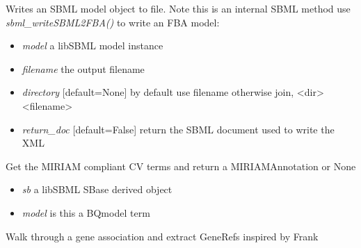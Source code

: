 \documentclass[a4paper,11pt,english]{sphinxmanual}
\begin{document}
\begin{fulllineitems}
\label{modules_doc:cbmpy.CBXML.sbml_exportSBML2FBAModel}
Writes an SBML model object to file. Note this is an internal SBML method use \emph{sbml\_writeSBML2FBA()} to write an FBA model:
\begin{itemize}
\item {} 
\emph{model} a libSBML model instance

\item {} 
\emph{filename} the output filename

\item {} 
\emph{directory} {[}default=None{]} by default use filename otherwise join, \textless{}dir\textgreater{}\textless{}filename\textgreater{}

\item {} 
\emph{return\_doc} {[}default=False{]} return the SBML document used to write the XML

\end{itemize}

\end{fulllineitems}


\begin{fulllineitems}
\label{modules_doc:cbmpy.CBXML.sbml_getCVterms}
Get the MIRIAM compliant CV terms and return a MIRIAMAnnotation or None
\begin{itemize}
\item {} 
\emph{sb} a libSBML SBase derived object

\item {} 
\emph{model} is this a BQmodel term

\end{itemize}

\end{fulllineitems}


\begin{fulllineitems}
\label{modules_doc:cbmpy.CBXML.sbml_getGeneRefs}
Walk through a gene association and extract GeneRefs inspired by Frank

\end{fulllineitems}
\end{document}
